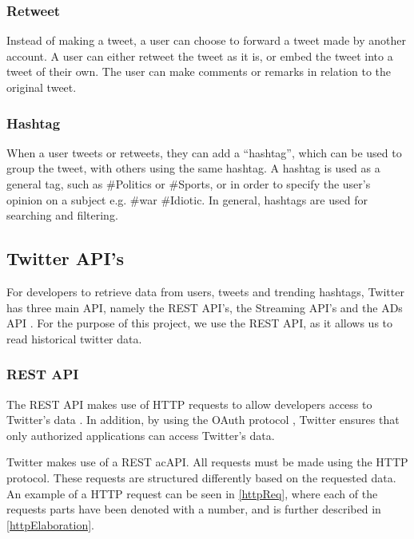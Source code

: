 \subsubsection{Retweet}
Instead of making a tweet, a user can choose to forward a tweet made by another
account. A user can either retweet the tweet as it is, or embed the tweet into a
tweet of their own. The user can make comments or remarks in relation to the
original tweet.

\subsubsection{Hashtag}
When a user tweets or retweets, they can add a ``hashtag'', which can be used to
group the tweet, with others using the same hashtag. A hashtag is used as a
general tag, such as \#Politics or \#Sports, or in order to specify the user's
opinion on a subject e.g. \#war \#Idiotic. In general, hashtags are used for
searching and filtering.

\subsection{Twitter API's}
For developers to retrieve data from users, tweets and trending hashtags,
Twitter has three main \ac{API}, namely the \ac{REST API}'s, the Streaming
\ac{API}'s and the \ac{ADs API} \citep{TwitterDevDocs}. For the purpose of this
project, we use the \ac{REST API}, as it allows us to read historical twitter
data.

\subsubsection{REST API}
The \ac{REST API} makes use of \ac{HTTP} requests to allow developers access to
Twitter's data \citep{TwitterREST}. In addition, by using the OAuth protocol
\citep{TwitterOAuth}, Twitter ensures that only authorized applications can
access Twitter's data.\nl

Twitter makes use of a \ac{REST} ac{API}. All requests must be made using the
\ac{HTTP} protocol. These requests are structured differently based on the
requested data. An example of a \ac{HTTP} request can be seen in
\autoref{httpReq}, where each of the requests parts have been denoted with a
number, and is further described in \autoref{httpElaboration}.


